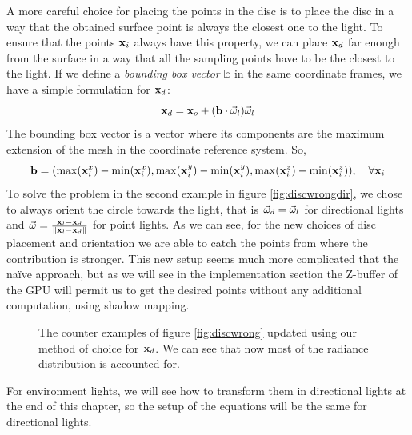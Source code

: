 A more careful choice for placing the points in the disc is to place the disc in a way that the obtained surface point is always the closest one to the light. To ensure that the points $\mathbf{x}_i$ always have this property, we can place $\mathbf{x}_d$ far enough from the surface in a way that all the sampling points have to be the closest to the light. If we define a \emph{bounding box vector} $\mathbb{b}$ in the same coordinate frames, we have a simple formulation for $\mathbf{x}_d$:
$$
\mathbf{x}_d = \mathbf{x}_o + (\mathbf{b} \cdot \vec{\omega}_l) \vec{\omega}_l
$$
The bounding box vector is a vector where its components are the maximum extension of the mesh in the coordinate reference system. So,
$$
\mathbf{b} = (\max(\mathbf{x}_i^x) - \min(\mathbf{x}_i^x), \max(\mathbf{x}_i^y) - \min(\mathbf{x}_i^y), \max(\mathbf{x}_i^z) - \min(\mathbf{x}_i^z)), \ \ \ \forall \mathbf{x}_i
$$ 
To solve the problem in the second example in figure \ref{fig:discwrongdir}, we chose to always orient the circle towards the light, that is $\vec{\omega}_d = \vec{\omega}_l$ for directional lights and $\vec{\omega} = \frac{\mathbf{x}_l - \mathbf{x}_d}{\|\mathbf{x}_l - \mathbf{x}_d\|}$ for point lights. As we can see, for the new choices of disc placement and orientation we are able to catch the points from where the contribution is stronger. This new setup seems much more complicated that the na\"{i}ve approach, but as we will see in the implementation section the Z-buffer of the GPU will permit us to get the desired points without any additional computation, using shadow mapping.
\begin{figure}
\centering
{}
\label{fig:discright}
\caption{The counter examples of figure \ref{fig:discwrong} updated using our method of choice for $\mathbf{x}_d$. We can see that now most of the radiance distribution is accounted for.}
\end{figure}
For environment lights, we will see how to transform them in directional lights at the end of this chapter, so the setup of the equations will be the same for directional lights.

